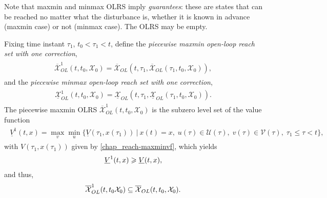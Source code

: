 \documentclass[letterpaper,10pt,english]{sphinxmanual}
\begin{document}
Note that maxmin and minmax OLRS imply \emph{guarantees}: these are states
that can be reached no matter what the disturbance is, whether it is
known in advance (maxmin case) or not (minmax case). The OLRS may be
empty.

Fixing time instant \(\tau_1\), \(t_0<\tau_1<t\), define the
\emph{piecewise maxmin open-loop reach set with one correction},
\label{chap_reach:equation-maxmin1}\begin{gather}
\begin{split}\overline{{\mathcal X}}_{OL}^1(t, t_0, {\mathcal X}_0) = \overline{{\mathcal X}}_{OL}(t, \tau_1, \overline{{\mathcal X}}_{OL}(\tau_1, t_0, {\mathcal X}_0)),\end{split}\label{chap_reach-maxmin1}
\end{gather}
and the \emph{piecewise minmax open-loop reach set with one correction},
\label{chap_reach:equation-minmax1}\begin{gather}
\begin{split}\underline{{\mathcal X}}_{OL}^1(t, t_0, {\mathcal X}_0) = \underline{{\mathcal X}}_{OL}(t, \tau_1, \underline{{\mathcal X}}_{OL}(\tau_1, t_0, {\mathcal X}_0)).\end{split}\label{chap_reach-minmax1}
\end{gather}
The piecewise maxmin OLRS
\(\overline{{\mathcal X}}_{OL}^1(t, t_0, {\mathcal X}_0)\) is the
subzero level set of the value function
\label{chap_reach:equation-maxminvf1}\begin{gather}
\begin{split}\underline{V}^1(t, x) =
\max_v\min_u\{\underline{V}(\tau_1, x(\tau_1)) ~|~ x(t)=x, \;
u(\tau)\in{\mathcal U}(\tau), \; v(\tau)\in{\mathcal V}(\tau), \; \tau_1\leqslant\tau<t\},\end{split}\label{chap_reach-maxminvf1}
\end{gather}
with \(V(\tau_1, x(\tau_1))\) given by \eqref{chap_reach-maxminvf}, which yields
\begin{gather}
\begin{split}\underline{V}^1(t, x) \geqslant\underline{V}(t, x),\end{split}\notag
\end{gather}
and thus,
\begin{gather}
\begin{split}\overline{{\mathcal X}}_{OL}^1(t, t_0 {\mathcal X}_0) \subseteq \overline{{\mathcal X}}_{OL}(t, t_0, {\mathcal X}_0) .\end{split}\notag
\end{gather}
\end{document}
